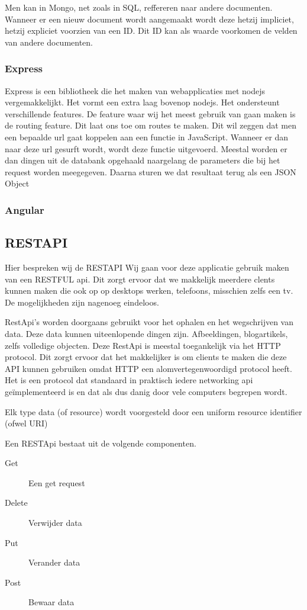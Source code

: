 \documentclass[a4paper,11pt]{article}
\begin{document}
Men kan in Mongo, net zoals in SQL, reffereren naar andere documenten. Wanneer er een nieuw document wordt aangemaakt wordt deze hetzij impliciet, hetzij expliciet voorzien van een ID. Dit ID kan als waarde voorkomen de velden van andere documenten.

\subsubsection{Express}
Express is een bibliotheek die het maken van webapplicaties met nodejs vergemakkelijkt. Het vormt een extra laag bovenop nodejs. Het ondersteunt verschillende features. De feature waar wij het meest gebruik van gaan maken is de routing feature. Dit laat ons toe om routes te maken. Dit wil zeggen dat men een bepaalde url gaat koppelen aan een functie in JavaScript. Wanneer er dan naar deze url gesurft wordt, wordt deze functie uitgevoerd. Meestal worden er dan dingen uit de databank opgehaald naargelang de parameters die bij het request worden meegegeven. Daarna sturen we dat resultaat terug als een JSON Object

\subsubsection{Angular}

\subsection{RESTAPI} %
Hier bespreken wij de RESTAPI
Wij gaan voor deze applicatie gebruik maken van een RESTFUL api. Dit zorgt
ervoor dat we makkelijk meerdere clents kunnen maken die ook op op desktops
werken, telefoons, misschien zelfs een tv. De mogelijkheden zijn nagenoeg
eindeloos.

RestApi's worden doorgaans gebruikt voor het ophalen en het wegschrijven van
data. Deze data kunnen uiteenlopende dingen zijn. Afbeeldingen, blogartikels,
zelfs volledige objecten. Deze RestApi is meestal toegankelijk via het HTTP
protocol. Dit zorgt ervoor dat het makkelijker is om clients te maken die deze
API kunnen gebruiken omdat HTTP een alomvertegenwoordigd protocol heeft. Het is
een protocol dat standaard in praktisch iedere networking api geïmplementeerd is
en dat als dus danig door vele computers begrepen wordt.

Elk type data (of resource) wordt voorgesteld door een uniform resource
identifier (ofwel URI)

Een RESTApi bestaat uit de volgende componenten.
\begin{description}
  \item [Get] Een get request
  \item [Delete] Verwijder data
  \item [Put] Verander data
  \item [Post] Bewaar data
\end{description}
\end{document}
